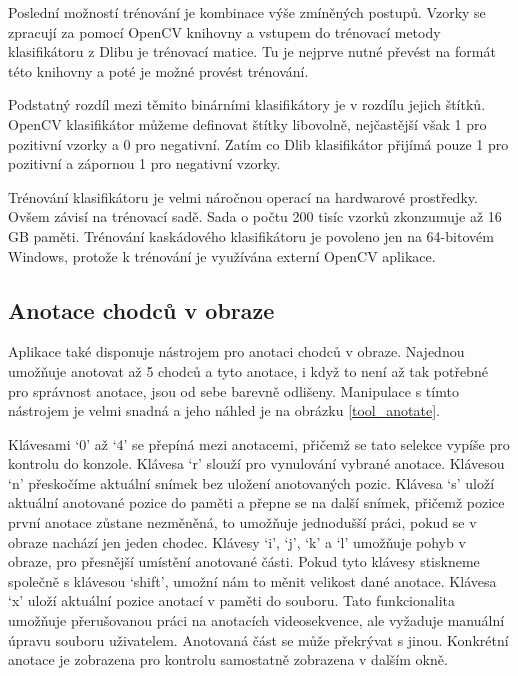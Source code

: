 Poslední možností trénování je kombinace výše zmíněných postupů. Vzorky se zpracují za pomocí OpenCV knihovny a vstupem do trénovací metody klasifikátoru z Dlibu je trénovací matice. Tu je nejprve nutné převést na formát této knihovny a poté je možné provést trénování.

Podstatný rozdíl mezi těmito binárními klasifikátory je v rozdílu jejich štítků. OpenCV klasifikátor můžeme definovat štítky libovolně, nejčastější však 1 pro pozitivní vzorky a 0 pro negativní. Zatím co Dlib klasifikátor přijímá pouze 1 pro pozitivní a zápornou 1 pro negativní vzorky.

Trénování klasifikátoru je velmi náročnou  operací na hardwarové prostředky. Ovšem závisí na trénovací sadě. Sada o počtu 200 tisíc vzorků zkonzumuje až 16 GB paměti.  Trénování kaskádového klasifikátoru je povoleno jen na  64-bitovém Windows, protože k trénování je využívána externí OpenCV aplikace. 

\subsection{Anotace chodců v obraze}
Aplikace také disponuje nástrojem pro anotaci chodců v obraze. Najednou umožňuje anotovat až 5 chodců a tyto anotace, i když to není až tak potřebné pro správnost anotace, jsou od sebe barevně odlišeny. Manipulace s tímto nástrojem je velmi snadná a jeho náhled je na obrázku \ref{tool_anotate}.

Klávesami `0' až `4' se přepíná mezi anotacemi, přičemž se tato selekce vypíše pro kontrolu do konzole. Klávesa `r' slouží pro vynulování vybrané anotace. Klávesou `n' přeskočíme aktuální snímek bez uložení anotovaných pozic. Klávesa `s' uloží aktuální anotované pozice do paměti a přepne se na další snímek, přičemž pozice první anotace zůstane nezměněná, to umožňuje jednodušší práci, pokud se v obraze nachází jen jeden chodec. Klávesy `i', `j', `k' a `l' umožňuje pohyb v obraze, pro přesnější umístění anotované části. Pokud tyto klávesy stiskneme společně s klávesou `shift', umožní nám to měnit velikost dané anotace. Klávesa `x' uloží aktuální pozice anotací v paměti do souboru. Tato funkcionalita umožňuje přerušovanou práci na anotacích videosekvence, ale vyžaduje manuální úpravu souboru uživatelem. Anotovaná část se může překrývat s jinou. Konkrétní anotace je zobrazena pro kontrolu samostatně zobrazena v dalším okně.

